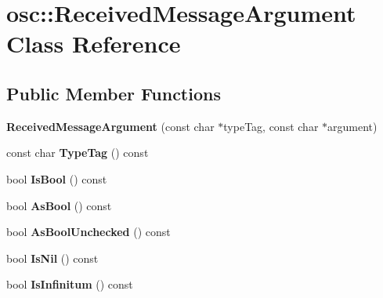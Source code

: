 \hypertarget{classosc_1_1_received_message_argument}{}\section{osc\+:\+:Received\+Message\+Argument Class Reference}
\label{classosc_1_1_received_message_argument}
\subsection*{Public Member Functions}
\begin{DoxyCompactItemize}
\item 
\mbox{\label{classosc_1_1_received_message_argument_a1d1420219f387d5066c5179b2173ffb7}} 
{\bfseries Received\+Message\+Argument} (const char $\ast$type\+Tag, const char $\ast$argument)
\item 
\mbox{\label{classosc_1_1_received_message_argument_a3814ede863e4d5e21adf4a1cd5ebc3f3}} 
const char {\bfseries Type\+Tag} () const
\item 
\mbox{\label{classosc_1_1_received_message_argument_a56d0eca22d9e6b880750381452967ff5}} 
bool {\bfseries Is\+Bool} () const
\item 
\mbox{\label{classosc_1_1_received_message_argument_aa1082de9453f073844a9e5fa974eba6c}} 
bool {\bfseries As\+Bool} () const
\item 
\mbox{\label{classosc_1_1_received_message_argument_aeddca115733a00b8f0c79b0b5cd4d8d4}} 
bool {\bfseries As\+Bool\+Unchecked} () const
\item 
\mbox{\label{classosc_1_1_received_message_argument_abf1a1b7e0ebf28e2dace10f81312f0c6}} 
bool {\bfseries Is\+Nil} () const
\item 
\mbox{\label{classosc_1_1_received_message_argument_aeacb14198cc21354009ba029e2f55a65}} 
bool {\bfseries Is\+Infinitum} () const
\item 

\end{DoxyCompactItemize}

